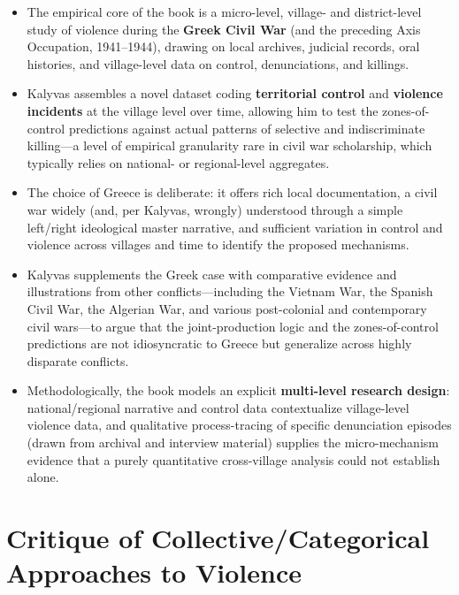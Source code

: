 \documentclass[12pt]{article}
\begin{document}
\begin{itemize}[leftmargin=*, itemsep=4pt]
    \item The empirical core of the book is a micro-level, village- and district-level study of violence during the \textbf{Greek Civil War} (and the preceding Axis Occupation, 1941--1944), drawing on local archives, judicial records, oral histories, and village-level data on control, denunciations, and killings.
    \item Kalyvas assembles a novel dataset coding \textbf{territorial control} and \textbf{violence incidents} at the village level over time, allowing him to test the zones-of-control predictions against actual patterns of selective and indiscriminate killing---a level of empirical granularity rare in civil war scholarship, which typically relies on national- or regional-level aggregates.
    \item The choice of Greece is deliberate: it offers rich local documentation, a civil war widely (and, per Kalyvas, wrongly) understood through a simple left/right ideological master narrative, and sufficient variation in control and violence across villages and time to identify the proposed mechanisms.
    \item Kalyvas supplements the Greek case with comparative evidence and illustrations from other conflicts---including the Vietnam War, the Spanish Civil War, the Algerian War, and various post-colonial and contemporary civil wars---to argue that the joint-production logic and the zones-of-control predictions are not idiosyncratic to Greece but generalize across highly disparate conflicts.
    \item Methodologically, the book models an explicit \textbf{multi-level research design}: national/regional narrative and control data contextualize village-level violence data, and qualitative process-tracing of specific denunciation episodes (drawn from archival and interview material) supplies the micro-mechanism evidence that a purely quantitative cross-village analysis could not establish alone.
\end{itemize}

\section{Critique of Collective/Categorical Approaches to Violence}
\end{document}
